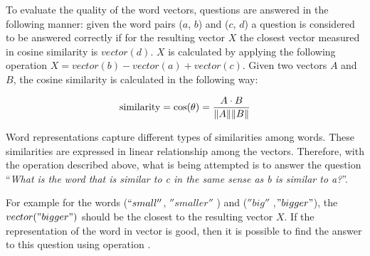 To evaluate the quality of the word vectors, questions  are answered in the
following manner: given the word pairs ($a$, $b$) and ($c$, $d$) a question
is considered to be answered correctly if  for the resulting vector $X$ the closest vector measured in
cosine similarity is  $vector(d)$. $X$ is calculated by applying the following
operation $X = vector(b) - vector(a) + vector(c)$.  Given two vectors $A$ and $B$, the
cosine similarity is calculated in the following way: 

$$\text{similarity} = \cos(\theta) = {A \cdot B \over \|A\| \|B\|}$$


Word representations capture different types of  similarities among
words. These similarities are expressed in linear relationship among the
vectors. Therefore, with the
operation described above,  what is  being attempted is to answer the
question ``\emph{What is the word that is similar to 
c in the same sense as b is similar to a?}''.

For example  for the words ($``small''$, $''smaller''$ ) and ($''big''$ ,$"bigger"$),
the $vector("bigger")$ should be the closest to the resulting
vector $X$.   If the representation of the word in
vector  is good, then it is possible to find the answer to this question
using  operation \cite{DBLP:journals/corr/abs-1301-3781}.



\renewcommand{\arraystretch}{1.3}

